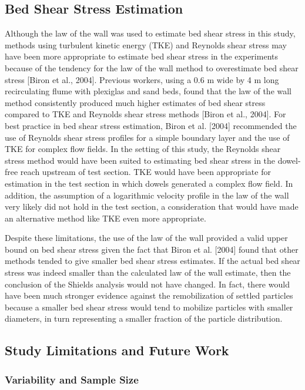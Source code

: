 \documentclass[12pt]{article}
\begin{document}
\subsection{Bed Shear Stress Estimation}

Although the law of the wall was used to estimate bed shear stress in this study, methods using turbulent kinetic energy (TKE) and Reynolds shear stress may have been more appropriate to estimate bed shear stress in the experiments because of the tendency for the law of the wall method to overestimate bed shear stress [Biron et al., 2004]. Previous workers, using a 0.6 m wide by 4 m long recirculating flume with plexiglas and sand beds, found that the law of the wall method consistently produced much higher estimates of bed shear stress compared to TKE and Reynolds shear stress methods [Biron et al., 2004]. For best practice in bed shear stress estimation, Biron et al. [2004] recommended the use of Reynolds shear stress profiles for a simple boundary layer and the use of TKE for complex flow fields. In the setting of this study, the Reynolds shear stress method would have been suited to estimating bed shear stress in the dowel-free reach upstream of test section. TKE would have been appropriate for estimation in the test section in which dowels generated a complex flow field. In addition, the assumption of a logarithmic velocity profile in the law of the wall very likely did not hold in the test section, a consideration that would have made an alternative method like TKE even more appropriate.

Despite these limitations, the use of the law of the wall provided a valid upper bound on bed shear stress given the fact that Biron et al. [2004] found that other methods tended to give smaller bed shear stress estimates. If the actual bed shear stress was indeed smaller than the calculated law of the wall estimate, then the conclusion of the Shields analysis would not have changed. In fact, there would have been much stronger evidence against the remobilization of settled particles because a smaller bed shear stress would tend to mobilize particles with smaller diameters, in turn representing a smaller fraction of the particle distribution.

\subsection{Study Limitations and Future Work}

\subsubsection{Variability and Sample Size}
\end{document}
